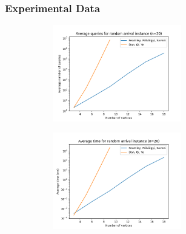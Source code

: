 \documentclass{beamer}
\begin{document}
\begin{frame}
\frametitle{Experimental Data}
    \begin{figure}[t]
        \begin{subfigure}
            \centering
            \includegraphics[width=2.2in]{avQueries.png}
        \end{subfigure}
        \begin{subfigure}
        \centering
        \includegraphics[width=2.2in]{avTime.png}
        \end{subfigure}
    \end{figure}
    
\end{frame}
\end{document}
